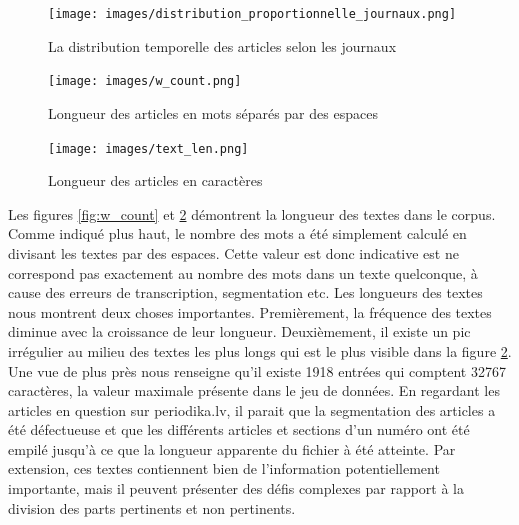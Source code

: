 \documentclass[a4paper,twoside,12pt]{article}
\begin{document}
\begin{figure}[!h]
\centering
\texttt{[image: images/distribution\_proportionnelle\_journaux.png]}
\caption{La distribution temporelle des articles selon les journaux}
\label{fig:publications}
\end{figure}

\begin{figure}[!h]
\begin{minipage}{0.5\textwidth}
    \centering
    \texttt{[image: images/w\_count.png]}
    \captionsetup{width=.8\linewidth}
    \caption{Longueur des articles en mots séparés par des espaces}
    \label{fig:w_count}
\end{minipage}
\begin{minipage}{0.5\textwidth}
    \centering
    \texttt{[image: images/text\_len.png]}
    \captionsetup{width=.8\linewidth}
    \caption{Longueur des articles en caractères}
    \label{fig:text_len}
\end{minipage}
\end{figure}

Les figures \ref{fig:w_count} et \ref{fig:text_len} démontrent la longueur des textes dans le corpus. Comme indiqué plus haut, le nombre des \og mots \fg{} a été simplement calculé en divisant les textes par des espaces. Cette valeur est donc indicative est ne correspond pas exactement au nombre des mots dans un texte quelconque, à cause des erreurs de transcription, segmentation etc. Les longueurs des textes nous montrent deux choses importantes. Premièrement, la fréquence des textes diminue avec la croissance de leur longueur. Deuxièmement, il existe un pic irrégulier au milieu des textes les plus longs qui est le plus visible dans la figure \ref{fig:text_len}. Une vue de plus près nous renseigne qu'il existe 1918 entrées qui comptent 32767 caractères, la valeur maximale présente dans le jeu de données. En regardant les articles en question sur periodika.lv, il parait que la segmentation des articles a été défectueuse et que les différents articles et sections d'un numéro ont été empilé jusqu'à ce que la longueur apparente du fichier à été atteinte. Par extension, ces textes contiennent bien de l'information potentiellement importante, mais il peuvent présenter des défis complexes par rapport à la division des parts pertinents et non pertinents.
\end{document}
